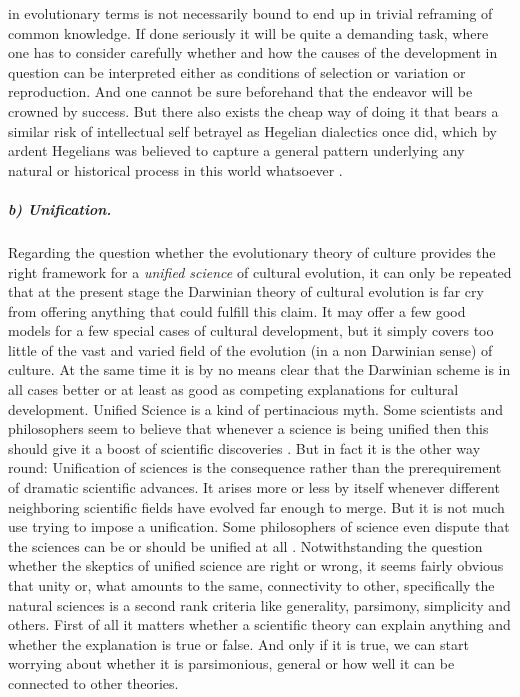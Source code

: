 in evolutionary terms is not necessarily bound to end up in trivial
reframing of common knowledge. If done seriously it will be quite a
demanding task, where one has to consider carefully whether and how
the causes of the development in question can be interpreted either as
conditions of selection or variation or reproduction. And one cannot
be sure beforehand that the endeavor will be crowned by success. But
there also exists the cheap way of doing it that bears a similar risk
of intellectual self betrayel as Hegelian dialectics once did, which
by ardent Hegelians was believed to capture a general pattern
underlying any natural or historical process in this world whatsoever
\cite[]{hegel:1830, engels:1878}.

\subparagraph{b) Unification.}

Regarding the question whether the evolutionary theory of culture provides
the right framework for a {\em unified science} of cultural evolution, it can
only be repeated that at the present stage the Darwinian theory of cultural
evolution is far cry from offering anything that could fulfill this claim. It
may offer a few good models for a few special cases of cultural development,
but it simply covers too little of the vast and varied field of the evolution
(in a non Darwinian sense) of culture. At the same time it is by no means
clear that the Darwinian scheme is in all cases better or at least as good as
competing explanations for cultural development. Unified Science is a kind of
pertinacious myth. Some scientists and philosophers seem to believe that
whenever a science is being unified then this should give it a boost of
scientific discoveries \cite[p.\ 19ff.]{tooby-cosmides:1992} \cite[p.\ 
329ff.]{mesoudi-laland-whiten:2006}. But in fact it is the other way round:
Unification of sciences is the consequence rather than the prerequirement of
dramatic scientific advances. It arises more or less by itself whenever
different neighboring scientific fields have evolved far enough to merge. But
it is not much use trying to impose a unification. Some philosophers of
science even dispute that the sciences can be or should be unified at all
\cite[]{dupre:1993, cartwright:1999}. Notwithstanding the question whether the
skeptics of unified science are right or wrong, it seems fairly obvious that
unity or, what amounts to the same, connectivity to other, specifically the
natural sciences is a second rank criteria like generality, parsimony,
simplicity and others. First of all it matters whether a scientific theory can
explain anything and whether the explanation is true or false. And only if it
is true, we can start worrying about whether it is parsimonious, general or how
well it can be connected to other theories.

